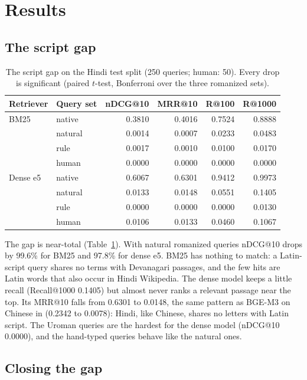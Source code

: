 \documentclass[11pt,a4paper]{article}
\begin{document}
\section{Results}

\subsection{The script gap}

\begin{table}[H]
\centering
\caption{The script gap on the Hindi test split (250 queries; human: 50). Every drop is
significant (paired $t$-test, Bonferroni over the three romanized sets).}
\label{tab:gap}
\small
\begin{tabular}{llrrrr}
\toprule
Retriever & Query set & nDCG@10 & MRR@10 & R@100 & R@1000 \\
\midrule
BM25     & native  & 0.3810 & 0.4016 & 0.7524 & 0.8888 \\
         & natural & 0.0014 & 0.0007 & 0.0233 & 0.0483 \\
         & rule    & 0.0017 & 0.0010 & 0.0100 & 0.0170 \\
         & human   & 0.0000 & 0.0000 & 0.0000 & 0.0000 \\
\midrule
Dense e5 & native  & 0.6067 & 0.6301 & 0.9412 & 0.9973 \\
         & natural & 0.0133 & 0.0148 & 0.0551 & 0.1405 \\
         & rule    & 0.0000 & 0.0000 & 0.0000 & 0.0130 \\
         & human   & 0.0106 & 0.0133 & 0.0460 & 0.1067 \\
\bottomrule
\end{tabular}
\end{table}

The gap is near-total (Table~\ref{tab:gap}). With natural romanized queries nDCG@10 drops by
99.6\% for BM25 and 97.8\% for dense e5. BM25 has nothing to match: a Latin-script query
shares no terms with Devanagari passages, and the few hits are Latin words that also occur in
Hindi Wikipedia. The dense model keeps a little recall (Recall@1000 0.1405) but almost never
ranks a relevant passage near the top. Its MRR@10 falls from 0.6301 to 0.0148, the same
pattern as BGE-M3 on Chinese in \citet{chari2025lost} (0.2342 to 0.0078): Hindi, like Chinese,
shares no letters with Latin script. The Uroman queries are the hardest for the dense model
(nDCG@10 0.0000), and the hand-typed queries behave like the natural ones.

\subsection{Closing the gap}
\end{document}
